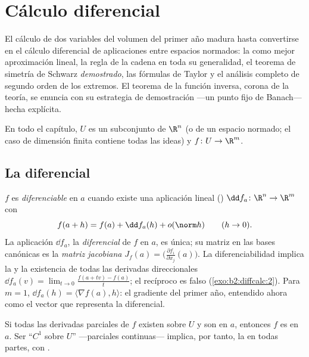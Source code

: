 \chapter{Cálculo diferencial}\label{ch:b2:diffcalc}

El cálculo de dos variables del volumen del primer año madura hasta
convertirse en el cálculo diferencial de aplicaciones entre espacios
normados: la \emph{} como mejor aproximación lineal, la regla
de la cadena en toda su generalidad, el teorema de simetría de Schwarz
\emph{demostrado}, las fórmulas de Taylor y el análisis completo de
segundo orden de los extremos. El teorema de la función inversa, corona
de la teoría, se enuncia con su estrategia de demostración ---un punto
fijo de Banach--- hecha explícita.

En todo el capítulo, $U$ es un subconjunto  de $\R^n$ (o de un
espacio normado; el caso de dimensión finita contiene todas las ideas)
y $f \colon U \to \R^m$.

\section{La diferencial}

\begin{definition}\label{def:b2:diffcalc:differential}
$f$ es \emph{diferenciable} en $a$ cuando existe
una aplicación lineal () $\dd f_a \colon \R^n \to \R^m$
con
\[
f(a + h) = f(a) + \dd f_a(h) + o(\norm h)
\qquad (h \to 0).
\]
La aplicación $\dd f_a$, la \emph{diferencial} de
$f$ en $a$, es única; su matriz en las bases canónicas es la
\emph{matriz jacobiana} $J_f(a) =
\bigl(\frac{\partial f_i}{\partial x_j}(a)\bigr)$. La
diferenciabilidad implica la  y la existencia de todas las
derivadas direccionales $\dd f_a(v) = \lim_{t\to0}\frac{f(a + tv) -
f(a)}{t}$; el recíproco es falso (\cref{exo:b2:diffcalc:2}). Para $m
= 1$, $\dd f_a(h) = \langle \nabla f(a), h\rangle$: el gradiente del
primer año, entendido ahora como el vector que representa la
diferencial.
\end{definition}

\begin{theorem}[Criterio $C^1$]\label{thm:b2:diffcalc:c1}
Si todas las derivadas parciales de $f$ existen sobre $U$ y son
 en $a$, entonces $f$ es  en $a$. Ser ``$C^1$
sobre $U$'' ---parciales continuas--- implica, por tanto, la
 en todas partes, con  .
\end{theorem}

